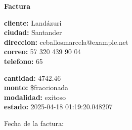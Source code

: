\documentclass{article}
\begin{document}
\begin{center}
    {\LARGE \textbf{Factura}}\\[1cm]
\end{center}

\textbf{cliente:} Landázuri \\
\textbf{ciudad:} Santander \\
\textbf{direccion:} ceballosmarcela@example.net \\
\textbf{correo:} 57 320 439 90 04 \\
\textbf{telefono:} 65 \\

\vspace{0.5cm}

\textbf{cantidad:} 4742.46 \\
\textbf{monto:} \$fraccionada \\
\textbf{modalidad:} exitoso \\
\textbf{estado:} 2025-04-18 01:19:20.048207 \\

\vspace{1cm}

Fecha de la factura: 
\end{document}
